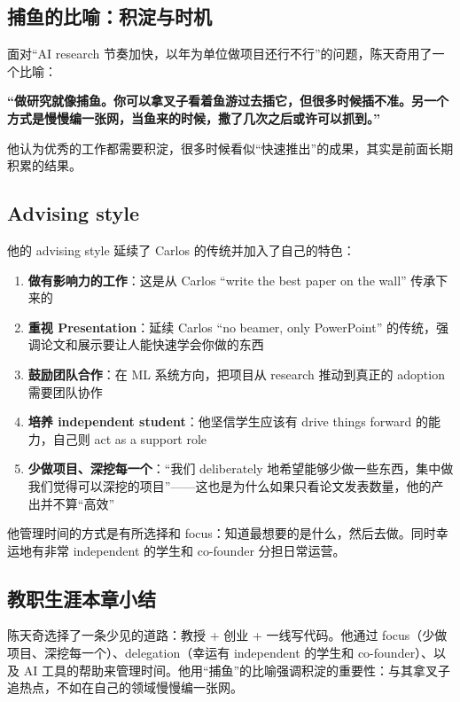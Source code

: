 \documentclass[a4paper]{article}
\begin{document}
\subsection{捕鱼的比喻：积淀与时机}

面对``AI research 节奏加快，以年为单位做项目还行不行''的问题，陈天奇用了一个比喻：

\textbf{``做研究就像捕鱼。你可以拿叉子看着鱼游过去插它，但很多时候插不准。另一个方式是慢慢编一张网，当鱼来的时候，撒了几次之后或许可以抓到。''}

他认为优秀的工作都需要积淀，很多时候看似``快速推出''的成果，其实是前面长期积累的结果。

\subsection{Advising style}

他的 advising style 延续了 Carlos 的传统并加入了自己的特色：

\begin{enumerate}
    \item \textbf{做有影响力的工作}：这是从 Carlos ``write the best paper on the wall'' 传承下来的
    \item \textbf{重视 Presentation}：延续 Carlos ``no beamer, only PowerPoint'' 的传统，强调论文和展示要让人能快速学会你做的东西
    \item \textbf{鼓励团队合作}：在 ML 系统方向，把项目从 research 推动到真正的 adoption 需要团队协作
    \item \textbf{培养 independent student}：他坚信学生应该有 drive things forward 的能力，自己则 act as a support role
    \item \textbf{少做项目、深挖每一个}：``我们 deliberately 地希望能够少做一些东西，集中做我们觉得可以深挖的项目''------这也是为什么如果只看论文发表数量，他的产出并不算``高效''
\end{enumerate}

他管理时间的方式是有所选择和 focus：知道最想要的是什么，然后去做。同时幸运地有非常 independent 的学生和 co-founder 分担日常运营。

\subsection{教职生涯本章小结}

陈天奇选择了一条少见的道路：教授 + 创业 + 一线写代码。他通过 focus（少做项目、深挖每一个）、delegation（幸运有 independent 的学生和 co-founder）、以及 AI 工具的帮助来管理时间。他用``捕鱼''的比喻强调积淀的重要性：与其拿叉子追热点，不如在自己的领域慢慢编一张网。
\end{document}
